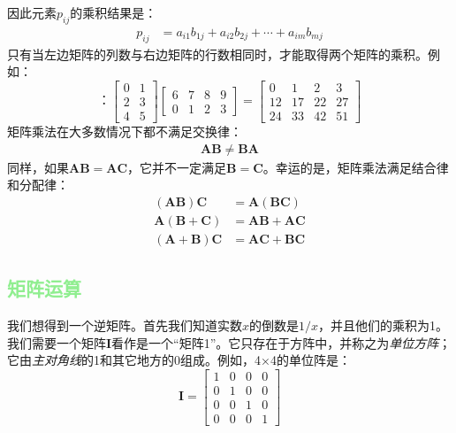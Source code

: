 \documentclass[lang=cn,12pt]{elegantbook}
\begin{document}
因此元素$p_{ij}$的乘积结果是：
\begin{align}
  p_{ij} & = a_{i1}b_{1j} + a_{i2}b_{2j}+ \cdots + a_{im}b_{mj}
\end{align}
只有当左边矩阵的列数与右边矩阵的行数相同时，才能取得两个矩阵的乘积。例如：
$$：\left[\begin{array}{ll}
      0 & 1 \\
      2 & 3 \\
      4 & 5
    \end{array}\right]\left[\begin{array}{llll}
      6 & 7 & 8 & 9 \\
      0 & 1 & 2 & 3
    \end{array}\right]=\left[\begin{array}{rrrr}
      0  & 1  & 2  & 3  \\
      12 & 17 & 22 & 27 \\
      24 & 33 & 42 & 51
    \end{array}\right]
$$
矩阵乘法在大多数情况下都不满足交换律：
\begin{align}
  \mathbf{AB} \neq \mathbf{BA}
\end{align}
同样，如果$\mathbf{AB} = \mathbf{AC}$，它并不一定满足$\mathbf{B} = \mathbf{C}$。幸运的是，矩阵乘法满足结合律和分配律：
$$
  \begin{aligned}
    (\mathbf{A B}) \mathbf{C}          & =\mathbf{A}(\mathbf{B C})  \\
    \mathbf{A}(\mathbf{B}+\mathbf{C})  & =\mathbf{A B}+\mathbf{A C} \\
    (\mathbf{A}+\mathbf{B}) \mathbf{C} & =\mathbf{A C}+\mathbf{B C}
  \end{aligned}
$$

\subsection{\textcolor{lightgreen}{矩阵运算}}

我们想得到一个逆矩阵。首先我们知道实数$x$的倒数是$1/x$，并且他们的乘积为1。我们需要一个矩阵$\mathbf{I}$看作是一个“矩阵1”。它只存在于方阵中，并称之为\textit{单位方阵}；它由\textit{主对角线}的1和其它地方的0组成。例如，4×4的单位阵是：
$$
  \mathbf{I}=\left[\begin{array}{llll}
      1 & 0 & 0 & 0 \\
      0 & 1 & 0 & 0 \\
      0 & 0 & 1 & 0 \\
      0 & 0 & 0 & 1
    \end{array}\right]
$$
\end{document}
